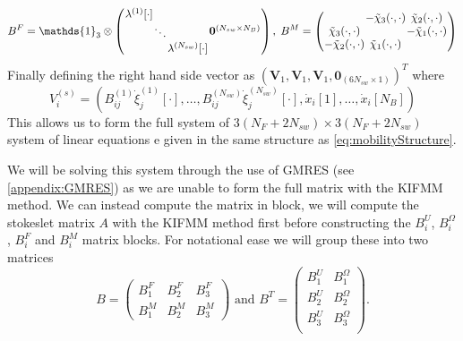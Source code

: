 \begin{equation*}
\arraycolsep=0.4pt\def\arraystretch{1}
    B^F = \mathds{1}_{3} \otimes \left(\begin{array}{cc}
         \begin{array}{ccc}
             \lambda^{(1)}[\cdot] & & \\
              & \ddots & \\
              & & \lambda^{(N_{sw})}[\cdot]
         \end{array} & \bm{0}^{(N_{sw} \times N_B)}
    \end{array}\right), \;
    B^M =
    \left(\begin{array}{ccc}
             & -\tilde{\chi}_3(\cdot,\cdot) & \tilde{\chi}_2(\cdot,\cdot)\\
            \tilde{\chi}_3(\cdot,\cdot) & & -\tilde{\chi}_1(\cdot,\cdot)\\
            -\tilde{\chi}_2(\cdot,\cdot) & \tilde{\chi}_1(\cdot,\cdot) &
          \end{array}\right)
\end{equation*}
Finally defining the right hand side vector as $(\bm{V}_1,\bm{V}_1,\bm{V}_1,\bm{0}_{(6N_{sw} \times 1)})^T$ where
\begin{equation*}
    V_i^{(s)} = (B_{ij}^{(1)}\dot{\xi}_j^{(1)}[\cdot],\dots,B_{ij}^{(N_{sw})}\dot{\xi}_j^{(N_{sw})}[\cdot],\dot{x}_i[1],\dots,\dot{x}_i[N_B])
\end{equation*}
This allows us to form the full system of $3(N_F+2N_{sw})\times3(N_F+2N_{sw})$ system of linear equations e given in the same structure as \cref{eq:mobilityStructure}.

We will be solving this system through the use of GMRES (see \cref{appendix:GMRES}) as we are unable to form the full matrix with the KIFMM method. We can instead compute the matrix in block, we will compute the stokeslet matrix $A$ with the KIFMM method first before constructing the $B_i^U$, $B_i^\Omega$, $B_i^F$ and $B_i^M$ matrix blocks. For notational ease we will group these into two matrices
\begin{equation*}
B = \left( \begin{array}{ccc}
B_{1}^{F} & B_{2}^{F} & B_{3}^{F} \\
B_{1}^{M} & B_{2}^{M} & B_{3}^{M}
\end{array}\right) \text{ and }
B^T = \left(\begin{array}{cc}
B_{1}^{U} & B_{1}^{\Omega} \\
B_{2}^{U} & B_{2}^{\Omega} \\
B_{3}^{U} & B_{3}^{\Omega} \\
\end{array}\right).
\end{equation*}


